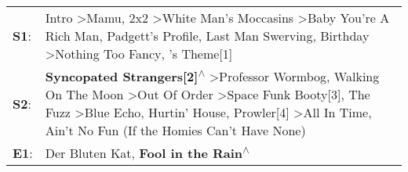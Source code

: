 \begin{supertabular}{p{0.03\textwidth}p{0.92\textwidth}}
 \textbf{S1}:  &                                                                                                                      Intro\textsuperscript{} \textgreater \enspace Mamu\textsuperscript{}, \enspace 2x2\textsuperscript{} \textgreater \enspace White Man's Moccasins\textsuperscript{} \textgreater \enspace Baby You're A Rich Man\textsuperscript{}, \enspace Padgett's Profile\textsuperscript{}, \enspace Last Man Swerving\textsuperscript{}, \enspace Birthday\textsuperscript{} \textgreater \enspace Nothing Too Fancy\textsuperscript{}, 's Theme[1]\textsuperscript{}  \enspace  \\
 \textbf{S2}:  &  \textbf{Syncopated Strangers[2]\textsuperscript{$\wedge$}} \textgreater \enspace Professor Wormbog\textsuperscript{}, \enspace Walking On The Moon\textsuperscript{} \textgreater \enspace Out Of Order\textsuperscript{} \textgreater \enspace Space Funk Booty[3]\textsuperscript{}, \enspace The Fuzz\textsuperscript{} \textgreater \enspace Blue Echo\textsuperscript{}, \enspace Hurtin' House\textsuperscript{}, \enspace Prowler[4]\textsuperscript{} \textgreater \enspace All In Time\textsuperscript{}, \enspace Ain't No Fun (If the Homies Can't Have None)\textsuperscript{}  \enspace  \\
 \textbf{E1}:  &                                                                                                                                                                                                                                                                                                                                                                                                                                                                                              Der Bluten Kat\textsuperscript{}, \enspace \textbf{Fool in the Rain\textsuperscript{$\wedge$}}  \enspace  \\
\end{supertabular}
